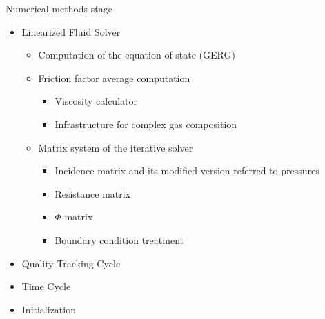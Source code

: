 \begin{frame}{Numerical methods stage}
\noindent


\begin{minipage}{0.25\textwidth}

\end{minipage}%
\hfill
\begin{minipage}{0.65\textwidth}
\begin{itemize}
    \item<1->{\textcolor{tealgreen}{Linearized Fluid Solver}
        \begin{itemize}
            \item Computation of the equation of state (GERG)
            \item Friction factor average computation
                \begin{itemize}
                    \item Viscosity calculator
                    \item Infrastructure for complex gas composition
                \end{itemize}
            \item Matrix system of the iterative solver
                \begin{itemize}
                    \item Incidence matrix and its modified version referred to pressures
                    \item Resistance matrix
                    \item $\Phi$ matrix
                    \item Boundary condition treatment
                \end{itemize}
        \end{itemize}
    }
    \item<2-> \textcolor{vinotinto}{Quality Tracking Cycle}
    \item<3-> \textcolor{dgreyblue}{Time Cycle}
    \item<4-> Initialization
\end{itemize}

\end{minipage}%

\end{frame}